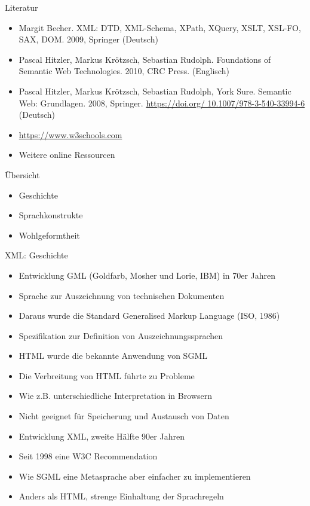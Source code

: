 \documentclass{beamer}
\begin{document}
\begin{frame}{Literatur}
	
	\begin{itemize}
		\item Margit Becher. XML: DTD, XML-Schema, XPath, XQuery, XSLT, XSL-FO, SAX, DOM. 2009, Springer (Deutsch)	
		\item Pascal Hitzler, Markus Krötzsch, Sebastian Rudolph. Foundations of Semantic Web Technologies. 2010, CRC Press. (Englisch)
		\item Pascal Hitzler, Markus Krötzsch, Sebastian Rudolph, York Sure. Semantic Web: Grundlagen. 2008, Springer. \url{https://doi.org/
			10.1007/978-3-540-33994-6} (Deutsch) 
		\item \url{https://www.w3schools.com}
		\item Weitere online Ressourcen
	\end{itemize}
	
\end{frame}

\begin{frame}{Übersicht}
	
	\begin{itemize}
		\item Geschichte
		\item Sprachkonstrukte
		\item Wohlgeformtheit
	\end{itemize}
	
\end{frame}

\begin{frame}{XML: Geschichte}
	
	\begin{itemize}
		\item Entwicklung GML (Goldfarb, Mosher und Lorie, IBM) in 70er Jahren
		\item Sprache zur Auszeichnung von technischen Dokumenten
		\item Daraus wurde die Standard Generalised Markup Language (ISO, 1986)
		\item Spezifikation zur Definition von Auszeichnungssprachen
		\item HTML wurde die bekannte Anwendung von SGML
		\item Die Verbreitung von HTML führte zu Probleme
		\item Wie z.B. unterschiedliche Interpretation in Browsern
		\item Nicht geeignet für Speicherung und Austausch von Daten
		\item Entwicklung XML, zweite Hälfte 90er Jahren
		\item Seit 1998 eine W3C Recommendation
		\item Wie SGML eine Metasprache aber einfacher zu implementieren
		\item Anders als HTML, strenge Einhaltung der Sprachregeln
	\end{itemize}
	
\end{frame}
\end{document}
